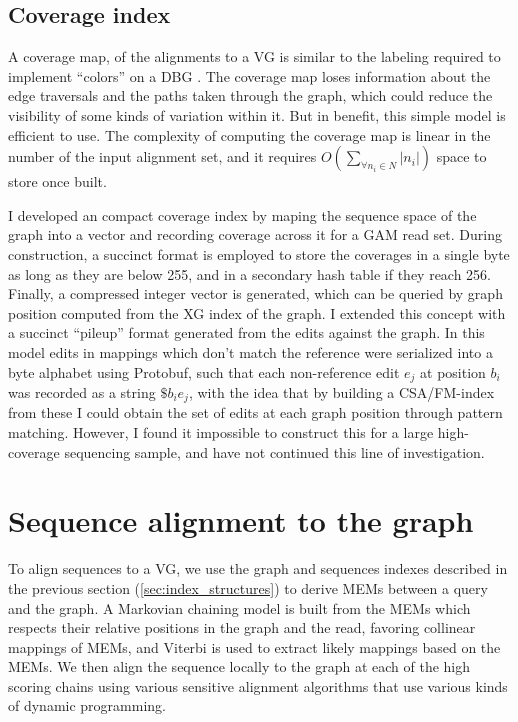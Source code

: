 \subsection{Coverage index}
\label{sec:coverage_index}

A coverage map, of the alignments to a VG is similar to the labeling required to implement ``colors'' on a DBG \cite{iqbal2012}.
The coverage map loses information about the edge traversals and the paths taken through the graph, which could reduce the visibility of some kinds of variation within it.
But in benefit, this simple model is efficient to use.
The complexity of computing the coverage map is linear in the number of the input alignment set, and it requires $O(\sum_{\forall{n_i\in N}}|n_i|)$ space to store once built.

I developed an compact coverage index by maping the sequence space of the graph into a vector and recording coverage across it for a GAM read set.
During construction, a succinct format is employed to store the coverages in a single byte as long as they are below 255, and in a secondary hash table if they reach 256.
Finally, a compressed integer vector is generated, which can be queried by graph position computed from the XG index of the graph.
I extended this concept with a succinct ``pileup'' format \cite{li2009sequence} generated from the edits against the graph.
In this model edits in mappings which don't match the reference were serialized into a byte alphabet using Protobuf, such that each non-reference edit $e_j$ at position $b_i$ was recorded as a string $\$b_i e_j$, with the idea that by building a CSA/FM-index from these I could obtain the set of edits at each graph position through pattern matching.
However, I found it impossible to construct this for a large high-coverage sequencing sample, and have not continued this line of investigation.

\section{Sequence alignment to the graph}
To align sequences to a VG, we use the graph and sequences indexes described in the previous section (\ref{sec:index_structures}) to derive MEMs between a query and the graph.
A Markovian chaining model is built from the MEMs which respects their relative positions in the graph and the read, favoring collinear mappings of MEMs, and Viterbi is used to extract likely mappings based on the MEMs.
We then align the sequence locally to the graph at each of the high scoring chains using various sensitive alignment algorithms that use various kinds of dynamic programming.

